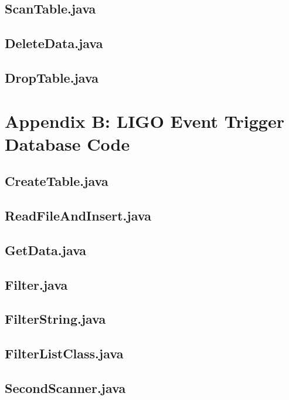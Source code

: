 \documentclass{article}
\begin{document}
\subsection{ScanTable.java}

\subsection{DeleteData.java}

\subsection{DropTable.java}


\section{Appendix B: LIGO Event Trigger Database Code}
\subsection{CreateTable.java}

\subsection{ReadFileAndInsert.java}

\subsection{GetData.java}

\subsection{Filter.java}

\subsection{FilterString.java}

\subsection{FilterListClass.java}

\subsection{SecondScanner.java}

\end{document}
